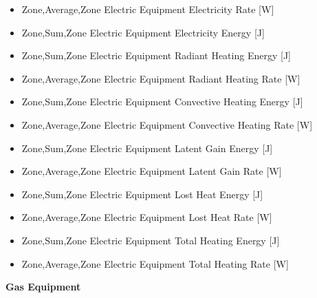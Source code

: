 \begin{itemize}
  Zone,Average,Space Electric Equipment Total Heating Rate {[}W{]}
\item
  Zone,Average,Zone Electric Equipment Electricity Rate {[}W{]}
\item
  Zone,Sum,Zone Electric Equipment Electricity Energy {[}J{]}
\item
  Zone,Sum,Zone Electric Equipment Radiant Heating Energy {[}J{]}
\item
  Zone,Average,Zone Electric Equipment Radiant Heating Rate {[}W{]}
\item
  Zone,Sum,Zone Electric Equipment Convective Heating Energy {[}J{]}
\item
  Zone,Average,Zone Electric Equipment Convective Heating Rate {[}W{]}
\item
  Zone,Sum,Zone Electric Equipment Latent Gain Energy {[}J{]}
\item
  Zone,Average,Zone Electric Equipment Latent Gain Rate {[}W{]}
\item
  Zone,Sum,Zone Electric Equipment Lost Heat Energy {[}J{]}
\item
  Zone,Average,Zone Electric Equipment Lost Heat Rate {[}W{]}
\item
  Zone,Sum,Zone Electric Equipment Total Heating Energy {[}J{]}
\item
  Zone,Average,Zone Electric Equipment Total Heating Rate {[}W{]}
\end{itemize}

\textbf{Gas Equipment}

